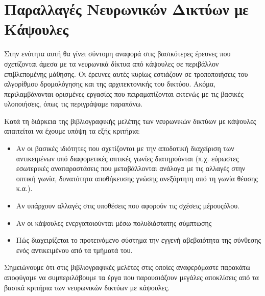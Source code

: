 \section{Παραλλαγές Νευρωνικών Δικτύων με Κάψουλες}

Στην ενότητα αυτή θα γίνει σύντομη αναφορά στις βασικότερες έρευνες που σχετίζονται άμεσα με τα νευρωνικά δίκτυα από κάψουλες σε περιβάλλον επιβλεπομένης μάθησης. Οι έρευνες αυτές κυρίως εστιάζουν σε τροποποιήσεις του αλγορίθμου δρομολόγησης και της αρχιτεκτονικής του δικτύου. Ακόμα, περιλαμβάνονται ορισμένες εργασίες που πειραματίζονται εκτενώς με τις βασικές υλοποιήσεις, όπως τις περιγράψαμε παραπάνω.\par

Κατά τη διάρκεια της βιβλιογραφικής μελέτης των νευρωνικών δικτύων με κάψουλες απαιτείται να έχουμε υπόψη τα εξής κριτήρια:
\begin{itemize}
    \item Αν οι βασικές ιδιότητες που σχετίζονται με την αποδοτική διαχείριση των αντικειμένων υπό διαφορετικές οπτικές γωνίες διατηρούνται (π.χ. εύρωστες εσωτερικές αναπαραστάσεις που μεταβάλλονται ανάλογα με τις αλλαγές στην οπτική γωνία, δυνατότητα αποθήκευσης γνώσης ανεξάρτητη από τη γωνία θέασης κ.α.).
    \item Αν υπάρχουν αλλαγές στις υποθέσεις που αφορούν τις σχέσεις μέρους\textendash όλου.
    \item Αν οι κάψουλες ενεργοποιούνται μέσω πολυδιάστατης σύμπτωσης 
    \item Πώς διαχειρίζεται το προτεινόμενο σύστημα την εγγενή αβεβαιότητα της σύνθεσης ενός αντικειμένου από τα τμήματά του. \cite{de2020introducing}
\end{itemize}\par

Σημειώνουμε ότι στις βιβλιογραφικές μελέτες στις οποίες αναφερόμαστε παρακάτω αποφύγαμε να συμπεριλάβουμε τα έργα που παρουσιάζουν μεγάλες αποκλίσεις από τα βασικά κριτήρια των νευρωνικών δικτύων με κάψουλες.\par

\subsubsection{}

